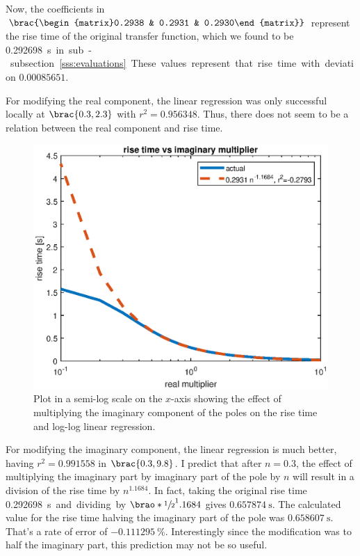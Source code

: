 \documentclass[12pt]{article}
\DeclarePairedDelimiter\brao()%
\DeclarePairedDelimiter\brac[]%
\begin{document}
Now, the coefficients in $\brac{\begin{matrix}0.2938 & 0.2931 & 0.2930\end{matrix}}$ represent the rise time of the original transfer function,
which we found to be \SI{0.292698}\second in sub-subsection~\ref{sss:evaluations}.
These values represent that rise time with deviation $\num{0.00085651}$.

For modifying the real component, the linear regression was only successful locally at $\brac{0.3, 2.3}$ with $r^2 = \num{0.956348}$.
Thus, there does not seem to be a relation between the real component and rise time.

\begin{figure}
    \centering
    \includegraphics[width=\linewidth]{img/part01_rise_time_vs_imag.eps}
    \caption{Plot in a semi-log scale on the $x$-axis
    showing the effect of multiplying the imaginary component of the poles on the rise time and log-log linear regression.}
    \label{fig:rise time vs imag}
\end{figure}

For modifying the imaginary component, the linear regression is much better, having $r^2 = 0.991558$ in $\brac{0.3, 9.8}$.
I predict that after $n = 0.3$, the effect of multiplying the imaginary part by imaginary part of the pole by $n$ will result in a division of the rise time by $n^{1.1684}$.
In fact, taking the original rise time \SI{0.292698}\second and dividing by $\brao*{\sfrac12}^1.1684$ gives $\SI{0.657874}\second$.
The calculated value for the rise time halving the imaginary part of the pole was $\SI{0.658607}\second$.
That's a rate of error of $\SI{-0.111295}\percent$.
Interestingly since the modification was to half the imaginary part, this prediction may not be so useful.
\end{document}
